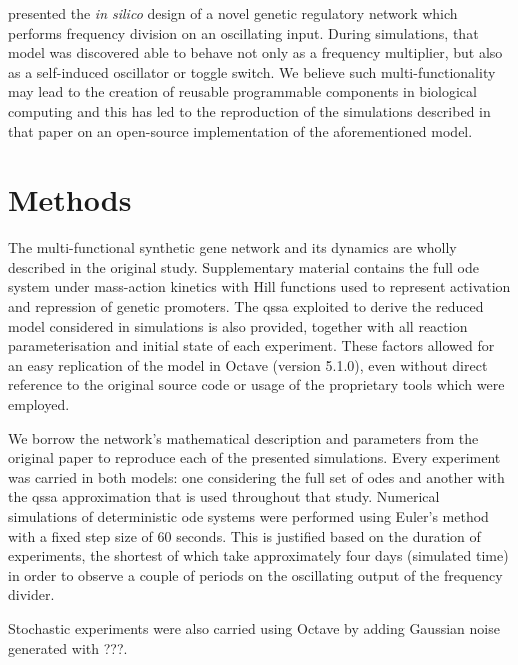   \citet{originals} presented the \textit{in silico} design of a novel genetic regulatory network which performs frequency division on an oscillating input.
  During simulations, that model was discovered able to behave not only as a frequency multiplier, but also as a self-induced oscillator or toggle switch.
  We believe such multi-functionality may lead to the creation of reusable programmable components in biological computing and this has led to the reproduction of the simulations described in that paper on an open-source implementation of the aforementioned model.


\section{Methods}

  The multi-functional synthetic gene network and its dynamics are wholly described in the original study.
  Supplementary material contains the full \ac{ode} system under mass-action kinetics with Hill functions used to represent activation and repression of genetic promoters.
  The \ac{qssa} exploited to derive the reduced model considered in simulations is also provided, together with all reaction parameterisation and initial state of each experiment.
  These factors allowed for an easy replication of the model in Octave (version 5.1.0), even without direct reference to the original source code or usage of the proprietary tools which were employed.

  We borrow the network's mathematical description and parameters from the original paper to reproduce each of the presented simulations.
  Every experiment was carried in both models: one considering the full set of \acs{odes} and another with the \ac{qssa} approximation that is used throughout that study.
  Numerical simulations of deterministic \ac{ode} systems were performed using Euler's method with a fixed step size of 60 seconds.
  This is justified based on the duration of experiments, the shortest of which take approximately four days (simulated time) in order to observe a couple of periods on the oscillating output of the frequency divider.


  Stochastic experiments were also carried using Octave by adding Gaussian noise generated with ???.


